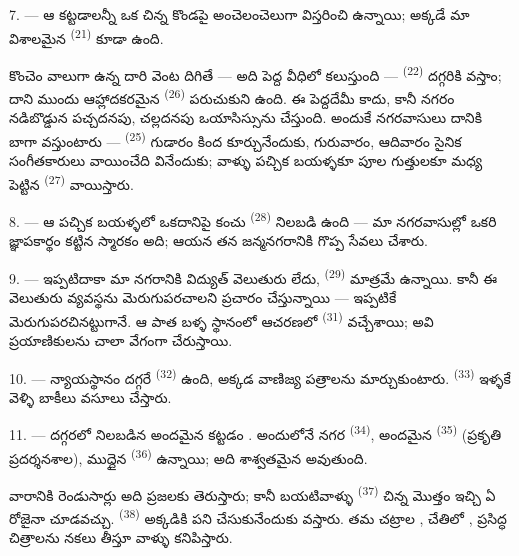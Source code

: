 7. --- ఆ కట్టడాలన్నీ ఒక చిన్న కొండపై అంచెలంచెలుగా విస్తరించి ఉన్నాయి; అక్కడే మా విశాలమైన
 \textsuperscript{(21)} కూడా ఉంది.

కొంచెం వాలుగా ఉన్న దారి వెంట దిగితే — అది పెద్ద వీధిలో కలుస్తుంది — 
\textsuperscript{(22)} దగ్గరికి వస్తాం; దాని ముందు ఆహ్లాదకరమైన 
\textsuperscript{(26)} పరుచుకుని ఉంది. ఈ  పెద్దదేమీ కాదు, కానీ నగరం
నడిబొడ్డున పచ్చదనపు, చల్లదనపు ఒయాసిస్సును చేస్తుంది. అందుకే నగరవాసులు దానికి బాగా
వస్తుంటారు —  \textsuperscript{(25)} గుడారం కింద కూర్చునేందుకు,
గురువారం, ఆదివారం సైనిక సంగీతకారులు వాయించేది వినేందుకు; వాళ్ళు పచ్చిక బయళ్ళకూ పూల
గుత్తులకూ మధ్య పెట్టిన  \textsuperscript{(27)} వాయిస్తారు.

8. --- ఆ పచ్చిక బయళ్ళలో ఒకదానిపై కంచు  \textsuperscript{(28)} నిలబడి ఉంది
— మా నగరవాసుల్లో ఒకరి జ్ఞాపకార్థం కట్టిన స్మారకం అది; ఆయన తన జన్మనగరానికి గొప్ప సేవలు
చేశారు.

\VUsaut{5.0mm}
\VUsaut{3.4mm}

9. --- ఇప్పటిదాకా మా నగరానికి విద్యుత్ వెలుతురు లేదు, 
\textsuperscript{(29)} మాత్రమే ఉన్నాయి. కానీ  ఈ వెలుతురు
వ్యవస్థను మెరుగుపరచాలని ప్రచారం చేస్తున్నాయి — 
ఇప్పటికే మెరుగుపరచినట్టుగానే.  ఆ పాత బళ్ళ స్థానంలో ఆచరణలో
 \textsuperscript{(31)} వచ్చేశాయి; అవి ప్రయాణికులను
 చాలా  వేగంగా చేరుస్తాయి.

10. --- న్యాయస్థానం దగ్గరే  \textsuperscript{(32)} ఉంది, అక్కడ వాణిజ్య
పత్రాలను మార్చుకుంటారు.  \textsuperscript{(33)} ఇళ్ళకే వెళ్ళి
బాకీలు వసూలు చేస్తారు.

\VUsaut{5.0mm}
\VUsaut{3.4mm}

11. --- దగ్గరలో నిలబడిన అందమైన కట్టడం . అందులోనే నగర
 \textsuperscript{(34)}, అందమైన 
\textsuperscript{(35)} (ప్రకృతి ప్రదర్శనశాల), ముద్దైన 
\textsuperscript{(36)} ఉన్నాయి; అది శాశ్వతమైన  అవుతుంది.

వారానికి రెండుసార్లు అది ప్రజలకు తెరుస్తారు; కానీ బయటివాళ్ళు 
\textsuperscript{(37)} చిన్న మొత్తం ఇచ్చి ఏ రోజైనా చూడవచ్చు. 
\textsuperscript{(38)} అక్కడికి పని చేసుకునేందుకు వస్తారు. తమ చట్రాల ,
చేతిలో , ప్రసిద్ధ చిత్రాలను నకలు తీస్తూ వాళ్ళు కనిపిస్తారు.

